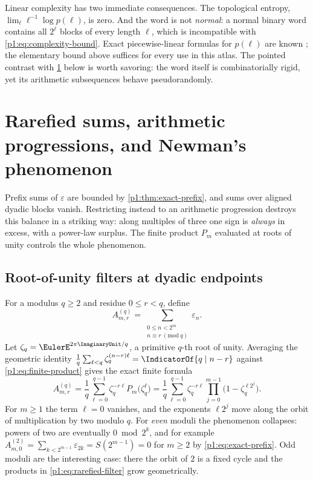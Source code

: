 \documentclass[11pt,oneside]{article}
\numberwithin{equation}{section}
\theoremstyle{definition}
\theoremstyle{remark}
\newcommand{\eps}{\varepsilon}
\begin{document}
Linear complexity has two immediate consequences.  The topological entropy,
\(\lim_\ell\ell^{-1}\log p(\ell)\), is zero.  And the word is not
\emph{normal}: a normal binary word contains all \(2^\ell\) blocks of every
length \(\ell\), which is incompatible with \eqref{p1:eq:complexity-bound}.
Exact piecewise-linear formulas for \(p(\ell)\) are known
\cite{p1:alloucheShallit2003}; the elementary bound above suffices for every
use in this atlas.  The pointed contrast with \cref{p1:sec:rarefied-newman}
below is worth savoring: the word itself is combinatorially rigid, yet its
arithmetic subsequences behave pseudorandomly.

\section[Rarefied sums and Newman's phenomenon]{Rarefied sums, arithmetic progressions, and Newman's phenomenon}
\label{p1:sec:rarefied-newman}

Prefix sums of \(\eps\) are bounded by \cref{p1:thm:exact-prefix}, and sums
over aligned dyadic blocks vanish.  Restricting instead to an arithmetic
progression destroys this balance in a striking way: along multiples of
three one sign is \emph{always} in excess, with a power-law surplus.  The
finite product \(P_m\) evaluated at roots of unity controls the whole
phenomenon.

\subsection{Root-of-unity filters at dyadic endpoints}

For a modulus \(q\ge2\) and residue \(0\le r<q\), define
\begin{equation}
  A^{(q)}_{m,r}
  =\sum_{\substack{0\le n<2^m\\ n\equiv r\ (\mathrm{mod}\ q)}}\eps_n.
  \label{p1:eq:rarefied-definition}
\end{equation}
Let \(\zeta_q=\EulerE^{2\pi\ImaginaryUnit/q}\), a primitive \(q\)-th root of unity.
Averaging the geometric identity
\(\smash{\frac1q\sum_{\ell<q}\zeta_q^{(n-r)\ell}}=\IndicatorOf{q\mid n-r}\)
against \eqref{p1:eq:finite-product} gives the exact finite formula
\begin{equation}
  \boxed{
  A^{(q)}_{m,r}
  =\frac1q\sum_{\ell=0}^{q-1}\zeta_q^{-r\ell}
   P_m\bigl(\zeta_q^{\ell}\bigr)
  =\frac1q\sum_{\ell=0}^{q-1}\zeta_q^{-r\ell}
   \prod_{j=0}^{m-1}\bigl(1-\zeta_q^{\ell2^j}\bigr).}
  \label{p1:eq:rarefied-filter}
\end{equation}
For \(m\ge1\) the term \(\ell=0\) vanishes, and the exponents
\(\ell2^j\) move along the orbit of multiplication by two modulo \(q\).
For \emph{even} moduli the phenomenon collapses: powers of two are
eventually \(0\bmod 2^k\), and for example
\(A^{(2)}_{m,0}=\sum_{k<2^{m-1}}\eps_{2k}=S(2^{m-1})=0\) for \(m\ge2\) by
\eqref{p1:eq:exact-prefix}.  Odd moduli are the interesting case: there the
orbit of \(2\) is a fixed cycle and the products in
\eqref{p1:eq:rarefied-filter} grow geometrically.
\end{document}
